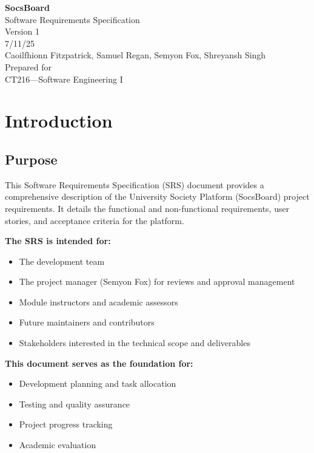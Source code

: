 \documentclass[12pt,a4paper]{article}
\begin{document}
\begin{titlepage}
    \centering
    \vspace*{2cm}
    {\LARGE \textbf{SocsBoard} \\[1.5em]}
    {\Large Software Requirements Specification \\[1em]}
    {\large Version 1 \\[0.5em] 7/11/25 \\[2em]}
    {\large Caoilfhionn Fitzpatrick, Samuel Regan, Semyon Fox, Shreyansh Singh \\[4em]}
    Prepared for\\
    CT216---Software Engineering I
    \vfill
\end{titlepage}

\tableofcontents
\newpage

\section{Introduction}

\subsection{Purpose}

This Software Requirements Specification (SRS) document provides a comprehensive description of the University Society Platform (SocsBoard) project requirements. It details the functional and non-functional requirements, user stories, and acceptance criteria for the platform.

\textbf{The SRS is intended for:}
\begin{itemize}
  \item The development team
  \item The project manager (Semyon Fox) for reviews and approval management
  \item Module instructors and academic assessors
  \item Future maintainers and contributors
  \item Stakeholders interested in the technical scope and deliverables
\end{itemize}

\textbf{This document serves as the foundation for:}
\begin{itemize}
    \item Development planning and task allocation
    \item Testing and quality assurance
    \item Project progress tracking
    \item Academic evaluation
\end{itemize}
\end{document}
